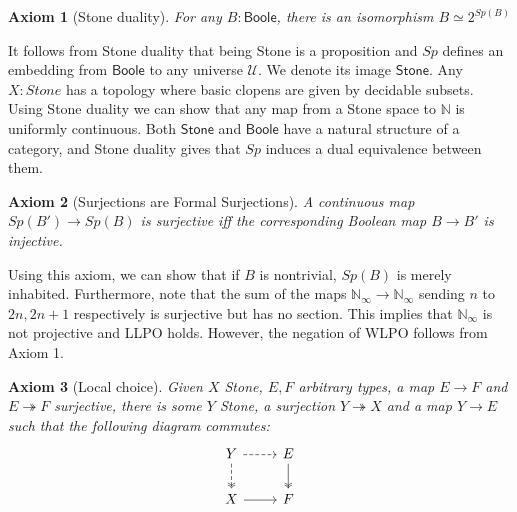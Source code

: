 \documentclass[letterpaper]{../../util/easychair}
\newtheorem{axiom}{Axiom}
\newcommand{\N}{\mathbb{N}}
\newcommand{\Boole}{\mathsf{Boole}}
\newcommand{\Stone}{\mathsf{Stone}}
\newcommand{\Noo}{\N_{\infty}}
\begin{document}
\begin{axiom}[Stone duality]
  For any 
  $B:\Boole$, 
  there is an isomorphism $B \simeq 2^{Sp(B)}$
\end{axiom}
It follows from Stone duality that being Stone is a proposition and $Sp$ defines an embedding from $\Boole$ 
to any universe $\mathcal U$. We denote its image $\Stone$. 
%
%
Any $X:Stone$ has a topology where basic clopens are given by decidable subsets. 
Using Stone duality we can show that any map from a Stone space to $\mathbb N$ is uniformly continuous. 
Both $\Stone$ and $\Boole$ have a natural structure of a category, and 
Stone duality gives that $Sp$ induces a dual equivalence between them. 

\begin{axiom}[Surjections are Formal Surjections]
  A continuous map $Sp(B')\to Sp(B)$ is surjective iff the corresponding Boolean map $B \to B'$ is injective.
\end{axiom} 
Using this axiom, we can show that if $B$ is nontrivial, $Sp(B)$ is merely inhabited.
%
%
Furthermore, note that the sum of the maps
$\Noo \to \Noo$
sending $n$ to $2n,2n+1$ respectively
is surjective but has no section. 
This implies that $\Noo$ is not projective and LLPO holds. 
However, the negation of WLPO follows from Axiom 1.  

\begin{axiom}[Local choice]
  Given $X$ Stone, $E,F$ arbitrary types, a map $E \to F$ and $E\twoheadrightarrow F$ surjective, 
  there is some $Y$ Stone,
    a surjection $Y \twoheadrightarrow X$ and a map $Y\to E$ such that the following diagram commutes:
    \begin{equation*}\begin{tikzcd}
      Y \arrow [d, two heads,dashed] \arrow [r,dashed] & E \arrow[d,""',two heads]\\
      X \arrow[r] & F
    \end{tikzcd}\end{equation*}  
\end{axiom} 
\end{document}
